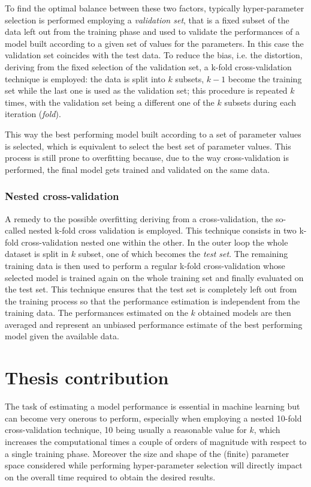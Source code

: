 To find the optimal balance between these two factors, typically hyper-parameter
selection is performed employing a \emph{validation set}, that is a fixed subset of the
data left out from the training phase and used to validate the performances of a
model built according to a given set of values for the parameters.
In this case the validation set coincides with the test data.
To reduce the bias, i.e. the distortion, deriving from the fixed selection of
the validation set, a k-fold cross-validation technique is employed: the
data is split into $k$ subsets, $k-1$ become the training set while the last one
is used as the validation set; this procedure is repeated $k$ times, with the
validation set being a different one of the $k$ subsets during each iteration
(\emph{fold}).

This way the best performing model built according to a set of parameter values
is selected, which is equivalent to select the best set of parameter values.
This process is still prone to overfitting because, due to the way cross-validation
is performed, the final model gets trained and validated on the same
data.

\subsubsection{Nested cross-validation}
A remedy to the possible overfitting deriving from a cross-validation,
the so-called nested k-fold cross validation is employed.
This technique consists in two k-fold cross-validation nested one within the other.
In the outer loop the whole dataset is split in $k$ subset, one of which becomes the
\emph{test set}.
The remaining training data is then used to perform a regular k-fold cross-validation
whose selected model is trained again on the whole training set and finally evaluated
on the test set.
This technique ensures that the test set is completely left out from the training
process so that the performance estimation is independent from the training data.
The performances estimated on the $k$ obtained models are then averaged and represent
an unbiased performance estimate of the best performing model given the available data.

\section{Thesis contribution}
The task of estimating a model performance is essential in machine learning
but can become very onerous to perform, especially when employing a nested 10-fold
cross-validation technique, 10 being usually a reasonable value for $k$, which
increases the computational times a couple of orders of magnitude with respect
to a single training phase.
Moreover the size and shape of the (finite) parameter space considered while performing
hyper-parameter selection will directly impact on the overall time required to
obtain the desired results.

